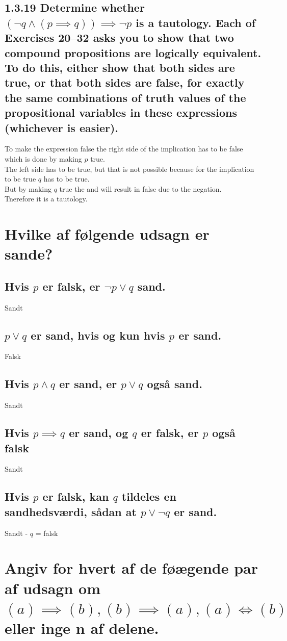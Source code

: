 \documentclass[12pt, a4paper]{report}
\begin{document}
			\setcounter{subsection}{18}
			\subsection{1.3.19 Determine whether $(\neg q \land (p \implies q)) \implies \neg p$ is a tautology. Each of Exercises 20–32 asks you to show that two compound propositions are logically equivalent. To do this, either show that both sides are true, or that both sides are false, for exactly the same combinations of truth values of the propositional variables in these expressions (whichever is easier).}
				To make the expression false the right side of the implication has to be false which is done by making $p$ true.\\
				The left side has to be true, but that is not possible because for the implication to be true $q$ has to be true.\\
				But by making $q$ true the and will result in false due to the negation.\\
				Tnerefore it is a tautology.
		\section{Hvilke af følgende udsagn er sande?}
			\subsection{Hvis $p$ er falsk, er $\neg p \lor q$ sand.}
				Sandt
			\subsection{$p\lor q$ er sand, hvis og kun hvis $p$ er sand.}
				Falsk
			\subsection{Hvis $p\land q$ er sand, er $p\lor q$ også sand.}
				Sandt
			\subsection{Hvis $p\implies q$ er sand, og $q$ er falsk, er $p$ også falsk}
				Sandt
			\subsection{Hvis $p$ er falsk, kan $q$ tildeles en sandhedsværdi, sådan at $p\lor \neg q$ er sand.}
				Sandt - $q$ = falsk
		\setcounter{section}{0}
		\section{Angiv for hvert af de føægende par af udsagn om $(a)\implies (b), (b)\implies (a), (a)\iff (b)$ eller inge n af delene.}
\end{document}
